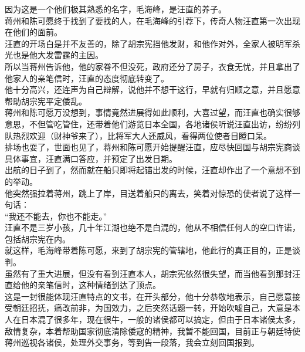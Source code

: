 \begin{multicols}{\theparacolNo}
因为这是一个他们极其熟悉的名字，毛海峰，是汪直的养子。\\

蒋州和陈可愿终于找到了要找的人，在毛海峰的引荐下，传奇人物汪直第一次出现在他们的面前。\\

汪直的开场白是并不友善的，除了胡宗宪挡他发财，和他作对外，全家人被明军杀光也是他大发雷霆的主因。\\

所以当蒋州告诉他，他的家眷不但没死，政府还分了房子，衣食无忧，并且拿出了他家人的亲笔信时，汪直的态度彻底转变了。\\

他十分高兴，还连声为自己辩解，说他并不想干这行，早就有归顺之意，并且愿意帮助胡宗宪平定倭乱。\\

蒋州和陈可愿万没想到，事情竟然进展得如此顺利，大喜过望，而汪直也确实很够意思，不但管吃管住，还带着他们游览日本全国，各地诸侯听说汪直出访，纷纷列队热烈欢迎（财神爷来了），比将军大人还威风，看得两位使者目瞪口呆。\\

排场也耍了，世面也见了，蒋州和陈可愿开始提醒汪直，应尽快回国与胡宗宪商谈具体事宜，汪直满口答应，并预定了出发日期。\\

出航的日子到了，然而就在船只即将起锚出发的时候，汪直却作出了一个意想不到的举动。\\

他突然强拉着蒋州，跳上了岸，目送着船只的离去，笑着对惊恐的使者说了这样一句话：\\

“我还不能去，你也不能走。”\\

汪直不是三岁小孩，几十年江湖也绝不是白混的，他从不相信任何人的空口许诺，包括胡宗宪在内。\\

就这样，毛海峰带着陈可愿，来到了胡宗宪的管辖地，他此行的真正目的，正是谈判。\\

虽然有了重大进展，但没有看到汪直本人，胡宗宪依然很失望，而当他看到那封汪直给他的亲笔信时，这种情绪到达了顶点。\\

这是一封很能体现汪直特点的文书，在开头部分，他十分恭敬地表示，自己愿意接受朝廷招抚，痛改前非，为国效力，之后突然话题一转，开始吹嘘自己，大意是本人在日本混了很多年，现在很牛，一般的诸侯都可以搞定，但由于日本诸侯太多，敌情复杂，本着帮助国家彻底清除倭寇的精神，我暂不能回国，目前正与朝廷特使蒋州巡视各诸侯，处理外交事务，等到告一段落，我会立刻回国报到。\\


\end{multicols}
